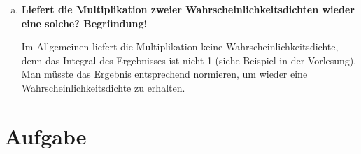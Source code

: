 \documentclass[a4paper]{scrartcl}
\begin{document}
\begin{enumerate}[a)]
	\item \textbf{Liefert die Multiplikation zweier Wahrscheinlichkeitsdichten wieder eine solche? Begründung!}
	
	Im Allgemeinen liefert die Multiplikation keine Wahrscheinlichkeitsdichte, denn das Integral des Ergebnisses ist nicht 1 (siehe Beispiel in der Vorlesung).\\
	Man müsste das Ergebnis entsprechend normieren, um wieder eine Wahrscheinlichkeitsdichte zu erhalten.
\end{enumerate}

\section{Aufgabe}
\end{document}
